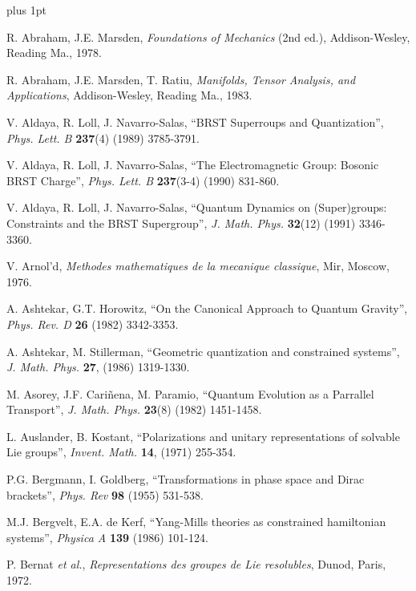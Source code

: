 \documentclass[12pt]{article}
\theoremstyle{plain}
\begin{document}
\begin{thebibliography}{55}

\itemsep 1pt plus 1pt


{\sc R. Abraham, J.E. Marsden},
{\it Foundations of Mechanics\/} (2nd ed.),
     Addison-Wesley, Reading Ma., 1978.

{\sc R. Abraham, J.E. Marsden, T. Ratiu},
{\it Manifolds, Tensor Analysis, and Applications},
Addison-Wesley, Reading Ma., 1983.

{\sc V. Aldaya, R. Loll, J. Navarro-Salas},
``BRST Superroups and Quantization'',
{\it Phys. Lett. B} {\bf 237}(4) (1989) 3785-3791.

{\sc V. Aldaya, R. Loll, J. Navarro-Salas},
``The Electromagnetic Group: Bosonic BRST Charge'',
{\it Phys. Lett. B} {\bf 237}(3-4) (1990) 831-860.

{\sc V. Aldaya, R. Loll, J. Navarro-Salas},
``Quantum Dynamics on (Super)groups: Constraints and the BRST
Supergroup'',
{\it J. Math. Phys.} {\bf 32}(12) (1991) 3346-3360.

{\sc V. Arnol'd},
{\it Methodes mathematiques de la mecanique classique\/},
Mir, Moscow, 1976.

{\sc A. Ashtekar, G.T. Horowitz},
``On the Canonical Approach to Quantum Gravity'',
{\it Phys. Rev. D} {\bf 26} (1982) 3342-3353.

{\sc A. Ashtekar, M. Stillerman},
``Geometric quantization and constrained systems'',
{\it J. Math. Phys.} {\bf 27}, (1986) 1319-1330.

{\sc M. Asorey, J.F. Cari\~nena, M. Paramio},
``Quantum Evolution as a Parrallel Transport'',
{\it J. Math. Phys.} {\bf 23}(8) (1982) 1451-1458.

{\sc L. Auslander, B. Kostant},
``Polarizations and unitary representations of solvable Lie groups'',
{\it Invent. Math.}
{\bf 14}, (1971) 255-354.

{\sc P.G. Bergmann, I. Goldberg},
``Transformations in phase space and Dirac brackets'',
{\it Phys. Rev} {\bf 98} (1955) 531-538.

{\sc M.J. Bergvelt, E.A. de Kerf},
``Yang-Mills theories as constrained hamiltonian systems'',
{\it Physica A} {\bf 139} (1986) 101-124.

{\sc P. Bernat} {\it et al.},
{\it Representations des groupes de Lie resolubles},
Dunod, Paris, 1972.


\end{thebibliography}
\end{document}
